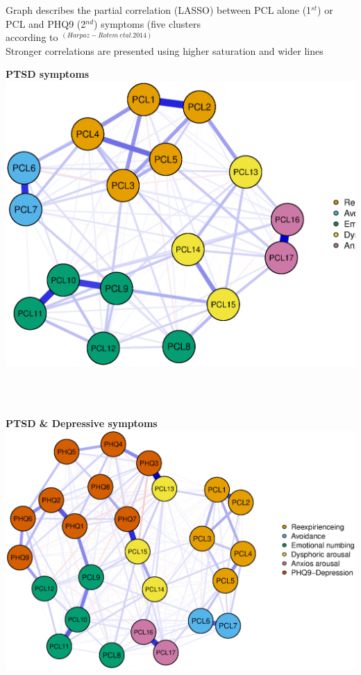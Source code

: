 \documentclass[]{betterposter}
\begin{document}
{Graph describes the partial correlation (LASSO) between PCL alone (1$^{st}$) or PCL and PHQ9 (2$^{nd}$) symptoms
(five clusters\\ according to $^{(Harpaz-Rotem \ et al. 2014)}$ \\ %
Stronger correlations are presented using higher saturation and wider lines
\begin{center}
\textbf{PTSD symptoms}
\includegraphics[width=\textwidth]{img/pclOnlyNetwork.eps}
\end{center}
\\

\\
\begin{center}
\textbf{PTSD \& Depressive symptoms}
\includegraphics[width=\textwidth]{img/PCL_PHQ9Network.eps}
\end{center}

}
\end{document}
